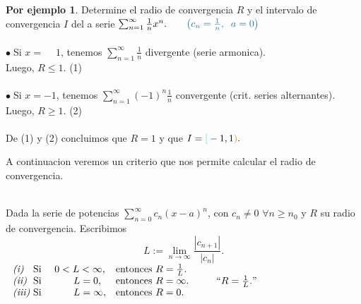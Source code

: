 \documentclass{article}
\theoremstyle{definition}
\newtheorem*{ej}{Por ejemplo}
\theoremstyle{remark}
\newcommand\bl{$\bullet\;$}
\begin{document}
\begin{ej}
  Determine el radio de convergencia $R$ y el intervalo de convergencia $I$ del a serie $\sum_{n=1}^{\infty}{\frac{1}{n}x^n}. \quad \quad \textcolor{azulp2}{\left(c_n=\frac{1}{n}, \; \; a=0\right)}$ \\ 
  \\
  \bl Si \textcolor{rojop2}{$x=\phantom{-}1$}, tenemos \textcolor{rojop2}{$\sum_{n=1}^{\infty}{\frac{1}{n}}$ divergente }(serie armonica). \\Luego, \textcolor{rojop2}{$R \leq 1$}. \textcolor{azulp2}{(1)} \\
  \\
  \bl Si \textcolor{verdep2}{$x=-1$}, tenemos \textcolor{verdep2}{$\sum_{n=1}^{\infty}{(-1)^n\frac{1}{n}}$ convergente }(crit. series alternantes). \\Luego, \textcolor{verdep2}{$R \geq 1$}. \textcolor{azulp2}{(2)} 
  \\\\
  De \textcolor{azulp2}{(1)} y  \textcolor{azulp2}{(2)} concluimos que $R=1$ y que $I=\textcolor{verdep2}{[}-1,1\textcolor{rojop2}{)}.$
\end{ej}

\pagebreak

A continuacion veremos un criterio que nos permite calcular el radio de convergencia.

\begin{teo} \; \\
  Dada la serie de potencias $\sum_{n=0}^{\infty}{c_n(x-a)^n}$, con $c_n \neq 0$\; $\forall n \geq n_0$ y $R$ su radio de convergencia. Escribimos \[ 
    L := \lim_{n\to\infty}{\frac{|c_{n+1}|}{|c_{n}|}}.
  \]
 $\left.
\begin{array}{lll}
  \emph{(i)\phantom{ii}} \text{ Si } & 0<L<\infty, & \text{entonces }R=\frac{1}{L}. \\
  \emph{(ii)\phantom{i}} \text{ Si} & \phantom{abcd}L=0, & \text{entonces }R=\infty. \\
  \emph{(iii)} \text{ Si } & \phantom{abcd}L=\infty, & \text{entonces }R=0.
\end{array}\right. \quad \quad ``R=\frac{1}{L}."$
\end{teo}
\end{document}
